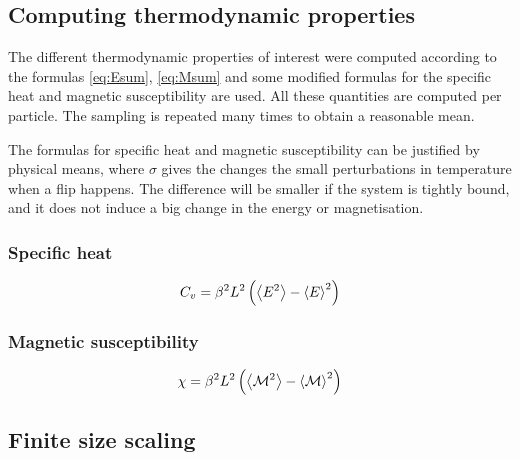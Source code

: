 \documentclass[11pt,a4paper,final]{article}
\numberwithin{equation}{section}
\newcommand{\magM}{\mathcal{M}}
\begin{document}
\subsection{Computing thermodynamic properties}
The different thermodynamic properties of interest were computed 
according to the formulas \eqref{eq:Esum}, \eqref{eq:Msum} and
some modified formulas for the specific heat and magnetic susceptibility
are used. All these quantities are computed per particle. The 
sampling is repeated many times to obtain a reasonable mean.

The formulas for specific heat and magnetic susceptibility can be 
justified by physical means, where $\sigma$ gives 
the changes the small perturbations in temperature when a flip happens.
The difference will be smaller if the system is tightly bound, and it 
does not induce a big change in the energy or magnetisation.

\subsubsection{Specific heat}
\begin{equation}
C_v = \beta^2L^2\left(\expval{E^2} - \expval{E}^2\right)
\end{equation}

\subsubsection{Magnetic susceptibility}
\begin{equation}
\chi = \beta^2 L^2 \left(\expval{\magM^2} - \expval{\magM}^2\right)
\end{equation}



\subsection{Finite size scaling}
\label{subsec:Tc}
\end{document}
